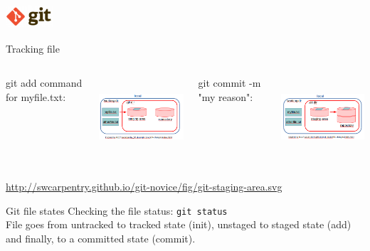 \begin{frame}[containsverbatim]
\frametitle{\includegraphics[height=0.8cm]{shared/logo-git.png}}
\begin{block}{Tracking file}
\begin{columns}
git add command for myfile.txt:
 \begin{center}
   \includegraphics[height=3cm]{05_history/Images/FAIR_git_add.png}
\end{center}
git commit -m "my reason":
 \begin{center}
   \includegraphics[height=3cm]{05_history/Images/FAIR_git_commit.png}
\end{center}
\end{columns}
\tiny{\url{http://swcarpentry.github.io/git-novice/fig/git-staging-area.svg}}
\end{block}
\begin{block}{Git file states}
Checking the file status: \verb|git status|\\
File goes from untracked to tracked state (init), unstaged to staged state (add) and finally, to a committed state (commit).
\end{block}
\end{frame}
